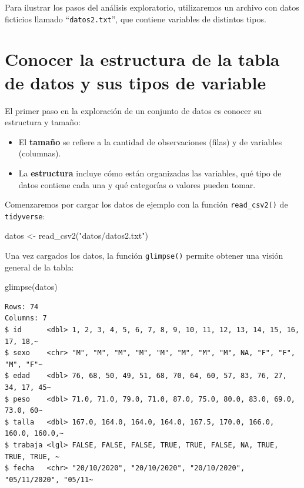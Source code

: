 \documentclass[
  spanish,
  a4paper,
]{scrbook}
\newenvironment{Shaded}{\begin{snugshade}}{\end{snugshade}}
\newcommand{\FunctionTok}[1]{\textcolor[rgb]{0.28,0.35,0.67}{#1}}
\newcommand{\NormalTok}[1]{\textcolor[rgb]{0.00,0.23,0.31}{#1}}
\newcommand{\OtherTok}[1]{\textcolor[rgb]{0.00,0.23,0.31}{#1}}
\newcommand{\StringTok}[1]{\textcolor[rgb]{0.13,0.47,0.30}{#1}}
\begin{document}
Para ilustrar los pasos del análisis exploratorio, utilizaremos un
archivo con datos ficticios llamado ``\texttt{datos2.txt}'', que
contiene variables de distintos tipos.

\section{Conocer la estructura de la tabla de datos y sus tipos de
variable}\label{conocer-la-estructura-de-la-tabla-de-datos-y-sus-tipos-de-variable}

El primer paso en la exploración de un conjunto de datos es conocer su
estructura y tamaño:

\begin{itemize}
\item
  El \textbf{tamaño} se refiere a la cantidad de observaciones (filas) y
  de variables (columnas).
\item
  La \textbf{estructura} incluye cómo están organizadas las variables,
  qué tipo de datos contiene cada una y qué categorías o valores pueden
  tomar.
\end{itemize}

Comenzaremos por cargar los datos de ejemplo con la función
\texttt{read\_csv2()} de \texttt{tidyverse}:

\begin{Shaded}
\begin{Highlighting}[]
\NormalTok{datos }\OtherTok{\textless{}{-}} \FunctionTok{read\_csv2}\NormalTok{(}\StringTok{"datos/datos2.txt"}\NormalTok{)}
\end{Highlighting}
\end{Shaded}

Una vez cargados los datos, la función \texttt{glimpse()} permite
obtener una visión general de la tabla:

\begin{Shaded}
\begin{Highlighting}[]
\FunctionTok{glimpse}\NormalTok{(datos)}
\end{Highlighting}
\end{Shaded}

\begin{verbatim}
Rows: 74
Columns: 7
$ id      <dbl> 1, 2, 3, 4, 5, 6, 7, 8, 9, 10, 11, 12, 13, 14, 15, 16, 17, 18,~
$ sexo    <chr> "M", "M", "M", "M", "M", "M", "M", "M", NA, "F", "F", "M", "F"~
$ edad    <dbl> 76, 68, 50, 49, 51, 68, 70, 64, 60, 57, 83, 76, 27, 34, 17, 45~
$ peso    <dbl> 71.0, 71.0, 79.0, 71.0, 87.0, 75.0, 80.0, 83.0, 69.0, 73.0, 60~
$ talla   <dbl> 167.0, 164.0, 164.0, 164.0, 167.5, 170.0, 166.0, 160.0, 160.0,~
$ trabaja <lgl> FALSE, FALSE, FALSE, TRUE, TRUE, FALSE, NA, TRUE, TRUE, TRUE, ~
$ fecha   <chr> "20/10/2020", "20/10/2020", "20/10/2020", "05/11/2020", "05/11~
\end{verbatim}
\end{document}
